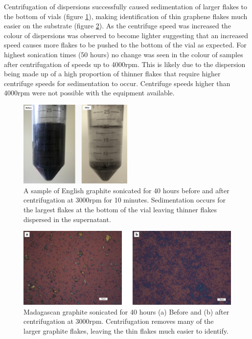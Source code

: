 \documentclass[12pt,titlepage]{article}
\begin{document}
	
	Centrifugation of dispersions successfully caused sedimentation of larger flakes to the bottom of vials (figure \ref{fig:centrifuge}), making identification of thin graphene flakes much easier on the substrate (figure \ref{fig:centrifuge-substrate}). As the centrifuge speed was increased the colour of dispersions was observed to become lighter suggesting that an increased speed causes more flakes to be pushed to the bottom of the vial as expected. For highest sonication times (50 hours) no change was seen in the colour of samples after centrifugation of speeds up to 4000rpm. This is likely due to the dispersion being made up of a high proportion of thinner flakes that require higher centrifuge speeds for sedimentation to occur. Centrifuge speeds higher than 4000rpm were not possible with the equipment available.
	
	\begin{figure}
		\centering
		\includegraphics[width=0.5\textwidth]{figures/centrifuge.png}
		\caption[The effects of centrifugation.]{A sample of English graphite sonicated for 40 hours before and after centrifugation at 3000rpm for 10 minutes. Sedimentation occurs for the largest flakes at the bottom of the vial leaving thinner flakes dispersed in the supernatant.}
		\label{fig:centrifuge}
	\end{figure}
	
	\begin{figure}
		\centering
		\includegraphics[width=1\textwidth]{figures/centrifuge-substrate.png}
		\caption[The effects of centrifugation after deposition.]{Madagascan graphite sonicated for 40 hours (a) Before and (b) after centrifugation at 3000rpm. Centrifugation removes many of the larger graphite flakes, leaving the thin flakes much easier to identify.}
		\label{fig:centrifuge-substrate}
	\end{figure}
	
\end{document}
